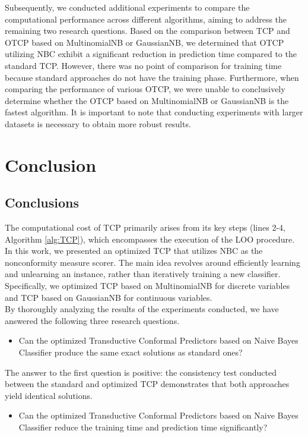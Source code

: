 \documentclass[10pt]{reportMaster}
\begin{document}
\noindent Subsequently, we conducted additional experiments to compare the computational performance across different algorithms, aiming to address the remaining two research questions. Based on the comparison between TCP and OTCP based on MultinomialNB or GaussianNB, we determined that OTCP utilizing NBC exhibit a significant reduction in prediction time compared to the standard TCP. However, there was no point of comparison for training time because standard approaches do not have the training phase. Furthermore, when comparing the performance of various OTCP, we were unable to conclusively determine whether the OTCP based on MultinomialNB or GaussianNB is the fastest algorithm. It is important to note that conducting experiments with larger datasets is necessary to obtain more robust results.

\chapter{Conclusion}
\section{Conclusions}

The computational cost of TCP primarily arises from its key steps (lines 2-4, Algorithm \ref{alg:TCP}), which encompasses the execution of the LOO procedure. In this work, we presented an optimized TCP that utilizes NBC as the nonconformity measure scorer. The main idea revolves around efficiently learning and unlearning an instance, rather than iteratively training a new classifier. Specifically, we optimized TCP based on MultinomialNB for discrete variables and TCP based on GaussianNB for continuous variables.\\

\noindent By thoroughly analyzing the results of the experiments conducted, we have answered the following three research questions.

\begin{itemize}
\item Can the optimized Transductive Conformal Predictors based on Naive Bayes Classifier produce the same exact solutions as standard ones?
\end{itemize}

\noindent The answer to the first question is positive: the consistency test conducted between the standard and optimized TCP demonstrates that both approaches yield identical solutions. 

\begin{itemize}
\item Can the optimized Transductive Conformal Predictors based on Naive Bayes Classifier reduce the training time and prediction time significantly?
\end{itemize}
\end{document}
